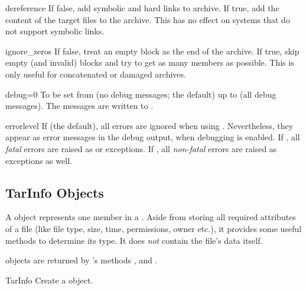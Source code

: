 \begin{memberdesc}{dereference}
    If false, add symbolic and hard links to archive. If true, add the
    content of the target files to the archive.  This has no effect on
    systems that do not support symbolic links.
\end{memberdesc}

\begin{memberdesc}{ignore_zeros}
    If false, treat an empty block as the end of the archive. If true,
    skip empty (and invalid) blocks and try to get as many members as
    possible. This is only useful for concatenated or damaged
    archives.
\end{memberdesc}

\begin{memberdesc}{debug=0}
    To be set from  (no debug messages; the default) up to
     (all debug messages). The messages are written to
    .
\end{memberdesc}

\begin{memberdesc}{errorlevel}
    If  (the default), all errors are ignored when using
    .  Nevertheless, they appear as error messages
    in the debug output, when debugging is enabled.  If , all
    \emph{fatal} errors are raised as  or
     exceptions.  If , all \emph{non-fatal}
    errors are raised as  exceptions as well.
\end{memberdesc}


\subsection{TarInfo Objects \label{tarinfo-objects}}

A  object represents one member in a
. Aside from storing all required attributes of a file
(like file type, size, time, permissions, owner etc.), it provides
some useful methods to determine its type. It does \emph{not} contain
the file's data itself.

 objects are returned by 's methods
,  and .

\begin{classdesc}{TarInfo}{}
    Create a  object.
\end{classdesc}


